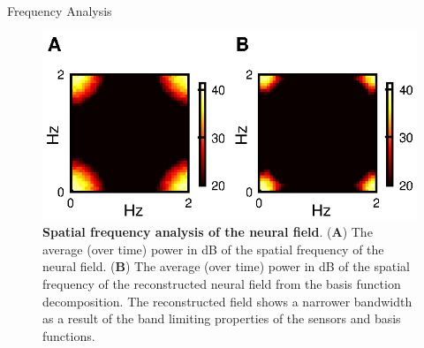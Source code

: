 \documentclass[final]{beamer}
\newlength{\onecolwid}
\begin{document}
\begin{frame}[t]
\begin{columns}[t]
\begin{column}{\onecolwid}
					  
      \begin{block}{Frequency Analysis}
		\begin{figure}
		\begin{center}
		\includegraphics[width=7in, scale = 10]{Figure4.eps}
		\end{center}
		\caption{{\bf Spatial frequency analysis of the neural field}. (\textbf{A}) The average (over time) power in dB of the spatial frequency of the neural field. (\textbf{B}) The average (over time) power in dB of the spatial frequency of the reconstructed neural field from the basis function decomposition. The reconstructed field shows a narrower bandwidth as a result of the band limiting properties of the sensors and basis functions.}
		\label{fig:Figure4}
		\end{figure}
\end{block}
\end{column}
\end{columns}
\end{frame}
\end{document}
